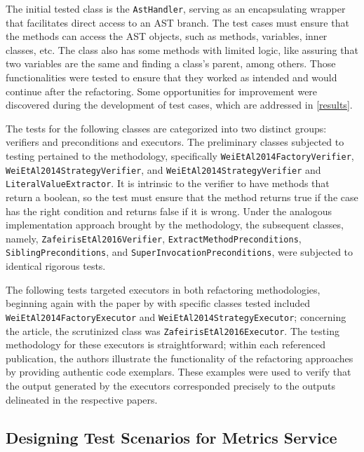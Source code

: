 The initial tested class is the \texttt{AstHandler}, serving as an encapsulating wrapper that facilitates direct access to an AST branch. The test cases must ensure that the methods can access the AST objects, such as methods, variables, inner classes, etc. The class also has some methods with limited logic, like assuring that two variables are the same and finding a class's parent, among others. Those functionalities were tested to ensure that they worked as intended and would continue after the refactoring. Some opportunities for improvement were discovered during the development of test cases, which are addressed in \cref{results}. 

The tests for the following classes are categorized into two distinct groups: verifiers and preconditions and executors. The preliminary classes subjected to testing pertained to the \textcite{liu2014automated} methodology, specifically \texttt{WeiEtAl2014FactoryVerifier}, \texttt{WeiEtAl2014StrategyVerifier}, and 	\texttt{WeiEtAl2014StrategyVerifier} and \texttt{LiteralValueExtractor}. It is intrinsic to the verifier to have methods that return a boolean, so the test must ensure that the method returns true if the case has the right condition and returns false if it is wrong. Under the analogous implementation approach brought by the \textcite{zafeiris2017automated} methodology, the subsequent classes, namely, \texttt{ZafeirisEtAl2016Verifier}, \texttt{ExtractMethodPreconditions}, \texttt{SiblingPreconditions}, and \texttt{SuperInvocationPreconditions}, were subjected to identical rigorous tests.

The following tests targeted executors in both refactoring methodologies, beginning again with the paper by \textcite{liu2014automated} with specific classes tested included \texttt{WeiEtAl2014FactoryExecutor} and \texttt{WeiEtAl2014StrategyExecutor}; concerning the 	\textcite{zafeiris2017automated} article, the scrutinized class was \texttt{ZafeirisEtAl2016Executor}. The testing methodology for these executors is straightforward; within each referenced publication, the authors illustrate the functionality of the refactoring approaches by providing authentic code exemplars. These examples were used to verify that the output generated by the executors corresponded precisely to the outputs delineated in the respective papers.

\subsection{Designing Test Scenarios for Metrics Service}

